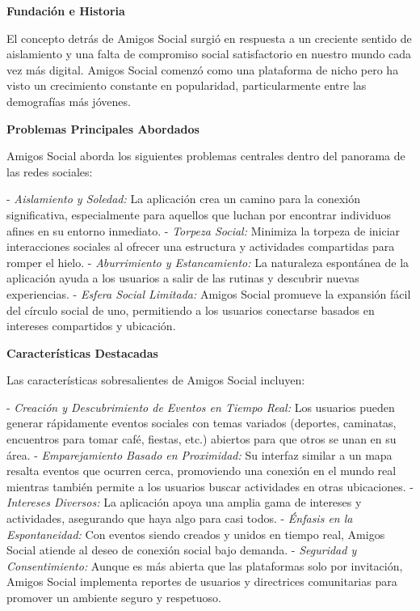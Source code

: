 \begin{itemize}
\textbf{Fundación e Historia}

El concepto detrás de Amigos Social surgió en respuesta a un creciente sentido de aislamiento y una falta de compromiso social 
satisfactorio en nuestro mundo cada vez más digital. Amigos Social comenzó como una plataforma de nicho pero ha visto un crecimiento constante en popularidad, particularmente entre las demografías más jóvenes.

\textbf{Problemas Principales Abordados}

Amigos Social aborda los siguientes problemas centrales dentro del panorama de las redes sociales:

- \textit{Aislamiento y Soledad:} La aplicación crea un camino para la conexión significativa, especialmente para aquellos que luchan por encontrar individuos afines en su entorno inmediato.
- \textit{Torpeza Social:} Minimiza la torpeza de iniciar interacciones sociales al ofrecer una estructura y actividades compartidas para romper el hielo.
- \textit{Aburrimiento y Estancamiento:} La naturaleza espontánea de la aplicación ayuda a los usuarios a salir de las rutinas y descubrir nuevas experiencias.
- \textit{Esfera Social Limitada:} Amigos Social promueve la expansión fácil del círculo social de uno, permitiendo a los usuarios conectarse basados en intereses compartidos y ubicación.

\textbf{Características Destacadas}

Las características sobresalientes de Amigos Social incluyen:

- \textit{Creación y Descubrimiento de Eventos en Tiempo Real:} Los usuarios pueden generar rápidamente eventos sociales con temas variados (deportes, caminatas, encuentros para tomar café, fiestas, etc.) abiertos para que otros se unan en su área.
- \textit{Emparejamiento Basado en Proximidad:} Su interfaz similar a un mapa resalta eventos que ocurren cerca, promoviendo una conexión en el mundo real mientras también permite a los usuarios buscar actividades en otras ubicaciones.
- \textit{Intereses Diversos:} La aplicación apoya una amplia gama de intereses y actividades, asegurando que haya algo para casi todos.
- \textit{Énfasis en la Espontaneidad:} Con eventos siendo creados y unidos en tiempo real, Amigos Social atiende al deseo de conexión social bajo demanda.
- \textit{Seguridad y Consentimiento:} Aunque es más abierta que las plataformas solo por invitación, Amigos Social implementa reportes de usuarios y directrices comunitarias para promover un ambiente seguro y respetuoso.


\end{itemize}
